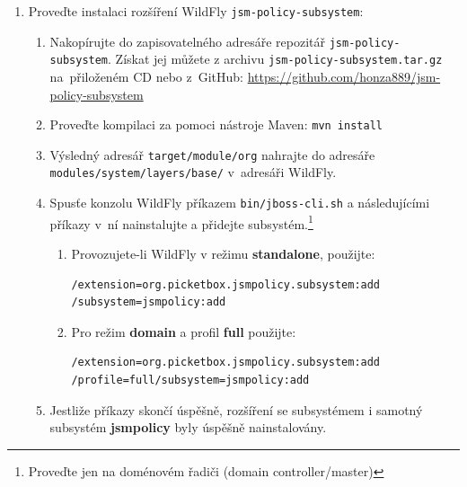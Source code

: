 \begin{enumerate}
  \item Proveďte instalaci rozšíření WildFly {\tt jsm-policy-subsystem}:
  \begin{enumerate}
    \item Nakopírujte do zapisovatelného adresáře repozitář {\tt jsm-policy-subsystem}. Získat jej můžete z archivu {\tt jsm-policy-subsystem.tar.gz} na~přiloženém CD nebo z~GitHub:
      \newline\url{https://github.com/honza889/jsm-policy-subsystem}
    \item Proveďte kompilaci za pomoci nástroje Maven: {\tt mvn install}
    \item Výsledný adresář {\tt target/module/org} nahrajte do adresáře {\tt modules/system/la\linebreak yers/base/} v~adresáři WildFly.\footnotemark[1]
    \item Spusťe konzolu WildFly příkazem {\tt bin/jboss-cli.sh} a následujícími příkazy v~ní nainstalujte a přidejte subsystém.\footnote{\label{master}Proveďte jen na doménovém řadiči (domain controller/master)}
    \begin{enumerate}
     \item Provozujete-li WildFly v režimu {\bf standalone}, použijte:
      \begin{lstlisting}
/extension=org.picketbox.jsmpolicy.subsystem:add
/subsystem=jsmpolicy:add
      \end{lstlisting}
     \item Pro režim {\bf domain} a profil {\bf full} použijte:
      \begin{lstlisting}
/extension=org.picketbox.jsmpolicy.subsystem:add
/profile=full/subsystem=jsmpolicy:add
      \end{lstlisting}
    \end{enumerate}
    \item Jestliže příkazy skončí úspěšně, rozšíření se subsystémem i samotný subsystém {\bf jsmpolicy} byly úspěšně nainstalovány.
  \end{enumerate}
  

\end{enumerate}
